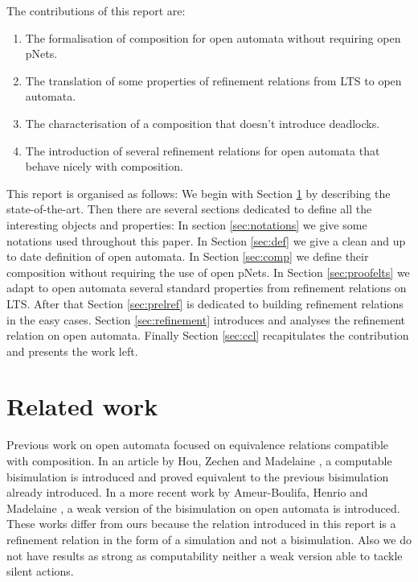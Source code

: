 \documentclass{article}
\begin{document}
The contributions of this report are:
\begin{enumerate}
\item The formalisation of composition for open automata without requiring open pNets.
\item The translation of some properties of refinement relations from LTS to open automata.
\item The characterisation of a composition that doesn't introduce deadlocks.
\item The introduction of several refinement relations for open automata that behave nicely with composition.
\end{enumerate}
This report is organised as follows:
We begin with Section \ref{sec:sota} by describing the state-of-the-art.
Then there are several sections dedicated to define all the interesting objects and properties:
In section \ref{sec:notations} we give some notations used throughout this paper.
In Section \ref{sec:def} we give a clean and up to date definition of open automata.
In Section \ref{sec:comp} we define their composition without requiring the use of open pNets.
In Section \ref{sec:proofelts} we adapt to open automata several standard properties from refinement relations on LTS.
After that Section \ref{sec:prelref} is dedicated to building refinement relations in the easy cases.
Section \ref{sec:refinement} introduces and analyses the refinement relation on open automata.
Finally Section \ref{sec:ccl} recapitulates the contribution and presents the work left.


\section{Related work}\label{sec:sota}
Previous work on open automata focused on equivalence relations compatible with composition.
In an article by Hou, Zechen and Madelaine \cite{10.1145/3372884.3373161}, a computable bisimulation is introduced and proved equivalent to the previous bisimulation already introduced.
In a more recent work by Ameur-Boulifa, Henrio and Madelaine \cite{2007.10770}, a weak version of the bisimulation on open automata is introduced.
These works differ from ours because the relation introduced in this report is a refinement relation in the form of a simulation and not a bisimulation.
Also we do not have results as strong as computability neither a weak version able to tackle silent actions.
\end{document}
